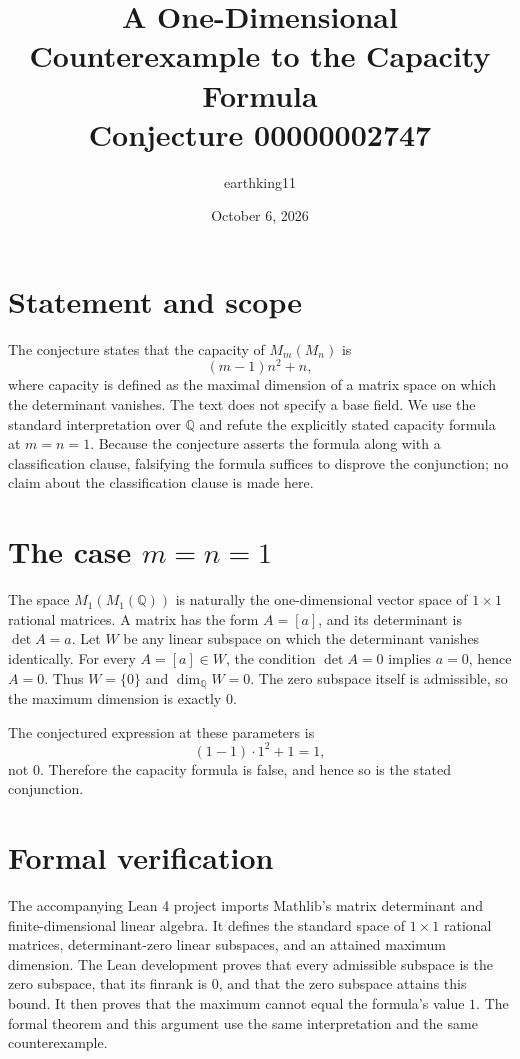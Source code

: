 \documentclass[11pt]{article}
\title{A One-Dimensional Counterexample to the Capacity Formula\\[2pt]
\large Conjecture 00000002747}
\author{earthking11}
\date{October 6, 2026}
\begin{document}
\maketitle

\section*{Statement and scope}
The conjecture states that the capacity of $M_m(M_n)$ is
\[
  (m-1)n^2+n,
\]
where capacity is defined as the maximal dimension of a matrix space on which
the determinant vanishes. The text does not specify a base field. We use the
standard interpretation over $\mathbb Q$ and refute the explicitly stated
capacity formula at $m=n=1$. Because the conjecture asserts the formula along
with a classification clause, falsifying the formula suffices to disprove the
conjunction; no claim about the classification clause is made here.

\section*{The case $m=n=1$}
The space $M_1(M_1(\mathbb Q))$ is naturally the one-dimensional vector space
of $1\times1$ rational matrices. A matrix has the form $A=[a]$, and its
determinant is $\det A=a$. Let $W$ be any linear subspace on which the
determinant vanishes identically. For every $A=[a]\in W$, the condition
$\det A=0$ implies $a=0$, hence $A=0$. Thus $W=\{0\}$ and
$\dim_{\mathbb Q}W=0$. The zero subspace itself is admissible, so the maximum
dimension is exactly $0$.

The conjectured expression at these parameters is
\[
  (1-1)\cdot 1^2+1=1,
\]
not $0$. Therefore the capacity formula is false, and hence so is the stated
conjunction.

\section*{Formal verification}
The accompanying Lean 4 project imports Mathlib's matrix determinant and
finite-dimensional linear algebra. It defines the standard space of
$1\times1$ rational matrices, determinant-zero linear subspaces, and an
attained maximum dimension. The Lean development proves that every admissible
subspace is the zero subspace, that its finrank is $0$, and that the zero
subspace attains this bound. It then proves that the maximum cannot equal the
formula's value $1$. The formal theorem and this argument use the same
interpretation and the same counterexample.
\end{document}
